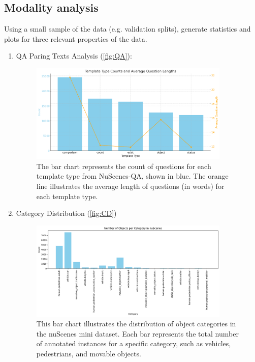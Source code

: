 \documentclass{article} %
\begin{document}
	\subsection{ Modality analysis}
	Using a small sample of the data (e.g. validation splits), generate statistics and plots for three relevant properties of the data.  
	
	\begin{enumerate}
		\item QA Paring Texts Analysis (\autoref{fig:QA}):
		\begin{figure}[H]
			\centering
			\includegraphics[width=0.9\textwidth]{Figures/Template Type Counts and Average Question Lengths.png}
			\caption{The bar chart represents the count of questions for each template type from NuScenes-QA, shown in blue. The orange line illustrates the average length of questions (in words) for each template type.}
			\label{fig:QA}
		\end{figure}
		\item Category Distribution (\autoref{fig:CD})
		\begin{figure}[H]
			\centering
			\includegraphics[width=0.9\textwidth]{Figures/nuscenes_category.png}
			\caption{This bar chart illustrates the distribution of object categories in the nuScenes mini dataset. Each bar represents the total number of annotated instances for a specific category, such as vehicles, pedestrians, and movable objects.}

\end{figure}
\end{enumerate}
\end{document}
